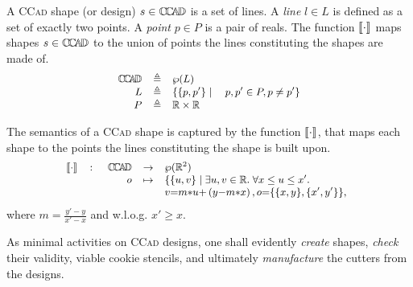
\begin{Definition} A \textsc{CCad}
shape (or design) $s\in \mathbb{C}\!\mathbb{C}\!\mathbb{A}\!\mathbb{D} $ is a set of lines. 
A \emph{line} $l \in L$ is defined as a set of exactly two points.
A \emph{point} $p\in P$ is a pair of reals.
The function $\llbracket \cdot \rrbracket$ maps shapes $s\in \mathbb{C}\!\mathbb{C}\!\mathbb{A}\!\mathbb{D} $ to the union of points 
the lines constituting the shapes are made of.
\begin{displaymath}
   \begin{small}
      \begin{array}{rcl rcl}
         \CCAD &\eqdef& \wp(L)\\
         L     &\eqdef& \{ \{p, p'\} \;|\; \quad p, p' \in P, p\neq p' \}\\
         P     &\eqdef& \mathbb{R} \times \mathbb{R}
      \end{array}
   \end{small}
\end{displaymath}

The semantics of a \textsc{CCad} shape is captured by the function 
$\llbracket \cdot \rrbracket$, that maps each shape to the points the lines constituting the 
shape is built upon. 
\begin{displaymath}
   \begin{small}
      \begin{array}{rcl}
         \SMapping & \colon & \!\!\!
            \begin{array}[t]{rcl}
               \CCAD &\to& \wp(\mathbb{R}^2) \\
                   o &\mapsto& \lbrace \lbrace u,v\rbrace \;|\; \exists 
u,v\in \mathbb{R}.\; 
                    \forall x \leq u \leq x'. \\
& & v{=}m{*}u{+}\left(y{-}m{*}x\right), o{=}\lbrace \lbrace x, y \rbrace, \lbrace x', y' \rbrace \rbrace,
            \end{array}\\
      \end{array}
   \end{small}
\end{displaymath}
\noindent 
where $m = \frac{y'-y}{x'-x}$ and w.l.o.g. $x' \geq x$.
\end{Definition}
As minimal activities on \textsc{CCad} designs, one shall evidently 
\emph{create} shapes, \emph{check} their validity, viable 
cookie stencils, and ultimately \emph{manufacture} the cutters from 
the designs.


